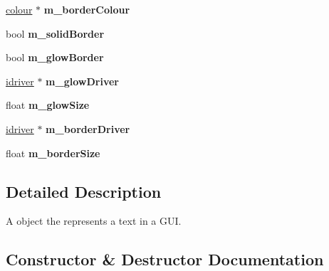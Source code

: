 \begin{DoxyCompactItemize}
\hyperlink{classflounder_1_1colour}{colour} $\ast$ {\bfseries m\+\_\+border\+Colour}
\item 
\mbox{\label{classflounder_1_1text_ad286951bb79bed5b0b313868d0a439ab}} 
bool {\bfseries m\+\_\+solid\+Border}
\item 
\mbox{\label{classflounder_1_1text_a2ade77fa608fd90ae7e6ec53ae79f3fc}} 
bool {\bfseries m\+\_\+glow\+Border}
\item 
\mbox{\label{classflounder_1_1text_a44fbfde14b3aeda62fbac94e476356cb}} 
\hyperlink{classflounder_1_1idriver}{idriver} $\ast$ {\bfseries m\+\_\+glow\+Driver}
\item 
\mbox{\label{classflounder_1_1text_aa4223814320165f082a133b61750c9d5}} 
float {\bfseries m\+\_\+glow\+Size}
\item 
\mbox{\label{classflounder_1_1text_a8d3493c46a99c6985f5286ad2f202279}} 
\hyperlink{classflounder_1_1idriver}{idriver} $\ast$ {\bfseries m\+\_\+border\+Driver}
\item 
\mbox{\label{classflounder_1_1text_a13d088a95fe0743d78eccc6bf0b9430c}} 
float {\bfseries m\+\_\+border\+Size}
\end{DoxyCompactItemize}


\subsection{Detailed Description}
A object the represents a text in a G\+UI. 



\subsection{Constructor \& Destructor Documentation}
\mbox{\label{classflounder_1_1text_a4b99960617867cc5159778aa42d99a19}} 
